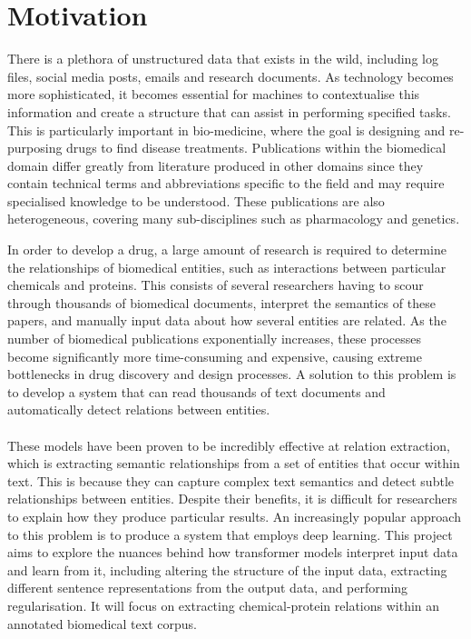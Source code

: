 \documentclass{l4proj}
\begin{document}

\section{Motivation}
There is a plethora of unstructured data that exists in the wild, including log files, social media posts, emails and research documents. As technology becomes more sophisticated, it becomes essential for machines to contextualise this information and create a structure that can assist in performing specified tasks. This is particularly important in bio-medicine, where the goal is designing and re-purposing drugs to find disease treatments. Publications within the biomedical domain differ greatly from literature produced in other domains since they contain technical terms and abbreviations specific to the field and may require specialised knowledge to be understood. These publications are also heterogeneous, covering many sub-disciplines such as pharmacology and genetics.

In order to develop a drug, a large amount of research is required to determine the relationships of biomedical entities, such as interactions between particular chemicals and proteins. This consists of several researchers having to scour through thousands of biomedical documents, interpret the semantics of these papers, and manually input data about how several entities are related. As the number of biomedical publications exponentially increases, these processes become significantly more time-consuming and expensive, causing extreme bottlenecks in drug discovery and design processes. A solution to this problem is to develop a system that can read thousands of text documents and automatically detect relations between entities. 
\\ \\
These models have been proven to be incredibly effective at relation extraction, which is extracting semantic relationships from a set of entities that occur within text. This is because they can capture complex text semantics and detect subtle relationships between entities. Despite their benefits, it is difficult for researchers to explain how they produce particular results. An increasingly popular approach to this problem is to produce a system that employs deep learning. This project aims to explore the nuances behind how transformer models interpret input data and learn from it, including altering the structure of the input data, extracting different sentence representations from the output data, and performing regularisation. It will focus on extracting chemical-protein relations within an annotated biomedical text corpus.
\end{document}
